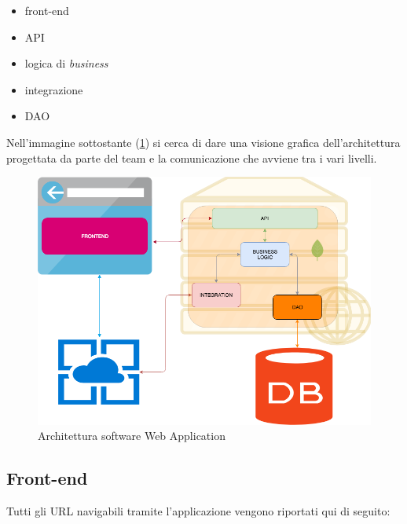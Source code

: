 \begin{itemize}
    \item front-end
    \item \gls{API}
    \item logica di \textit{business}
    \item integrazione
    \item \gls{DAO}
\end{itemize}
\clearpage


Nell'immagine sottostante (\ref{fig:archisw}) si cerca di dare una visione grafica dell'architettura progettata da parte del team e la comunicazione che avviene tra i vari livelli.


\begin{figure}
\begin{center}
\includegraphics[width=0.8\columnwidth]{images/architetturasw.png}
\end{center}
\caption{Architettura software Web Application \cite{archiprog}}
\label{fig:archisw}
\end{figure}

\subsection{Front-end}
Tutti gli \gls{URL} navigabili tramite l'applicazione vengono riportati qui di seguito:

